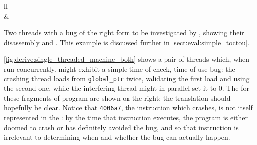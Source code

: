 \begin{sanefig}
\begin{tabular}{ll}
{      \label{fig:derive:single_threaded_machine}
    }
    \\
     &
    \\
  \end{tabular}
  \vspace{-12pt}
  \caption{Two threads with a bug of the right form to be investigated
    by {\technique}, showing their disassembly and {\StateMachines}.
    This example is discussed further in
    \autoref{sect:eval:simple_toctou}.}
  \label{fig:derive:single_threaded_machine_both}
\end{sanefig}

\autoref{fig:derive:single_threaded_machine_both} shows a pair of
threads which, when run concurrently, might exhibit a simple
time-of-check, time-of-use bug: the crashing thread loads from
\texttt{global\_ptr} twice, validating the first load and using the
second one, while the interfering thread might in parallel set it to
0.  The {\StateMachines} for these fragments of program are shown on
the right; the translation should hopefully be clear.  Notice that
\verb|4006a7|, the instruction which crashes, is not itself
represented in the {\StateMachine}: by the time that instruction
executes, the program is either doomed to crash or has definitely
avoided the bug, and so that instruction is irrelevant to determining
when and whether the bug can actually happen.

